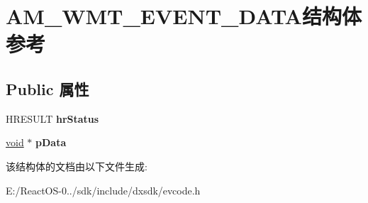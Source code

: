 \hypertarget{struct_a_m___w_m_t___e_v_e_n_t___d_a_t_a}{}\section{A\+M\+\_\+\+W\+M\+T\+\_\+\+E\+V\+E\+N\+T\+\_\+\+D\+A\+T\+A结构体 参考}
\label{struct_a_m___w_m_t___e_v_e_n_t___d_a_t_a}
\subsection*{Public 属性}
\begin{DoxyCompactItemize}
\item 
\mbox{\label{struct_a_m___w_m_t___e_v_e_n_t___d_a_t_a_a6ff2a1cbcb7f7d2875411170b2e777c2}} 
H\+R\+E\+S\+U\+LT {\bfseries hr\+Status}
\item 
\mbox{\label{struct_a_m___w_m_t___e_v_e_n_t___d_a_t_a_af133d4b2ec4c7547a458bf32c1f8e072}} 
\hyperlink{interfacevoid}{void} $\ast$ {\bfseries p\+Data}
\end{DoxyCompactItemize}


该结构体的文档由以下文件生成\+:\begin{DoxyCompactItemize}
\item 
E\+:/\+React\+O\+S-\/0../sdk/include/dxsdk/evcode.\+h\end{DoxyCompactItemize}
